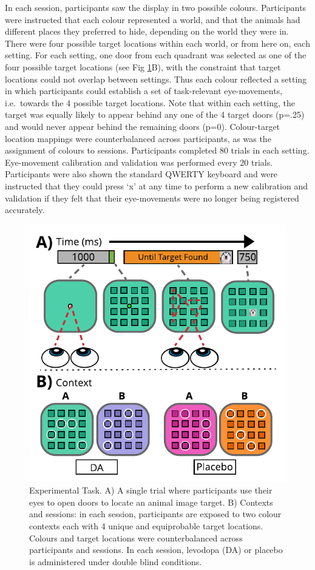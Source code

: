 \documentclass[
  man]{apa6}
\begin{document}
In each session, participants saw the display in two possible colours. Participants were instructed that each colour represented a world, and that the animals had different places they preferred to hide, depending on the world they were in. There were four possible target locations within each world, or from here on, each setting. For each setting, one door from each quadrant was selected as one of the four possible target locations (see Fig \ref{fig:taskfig}B), with the constraint that target locations could not overlap between settings. Thus each colour reflected a setting in which participants could establish a set of task-relevant eye-movements, i.e.~towards the 4 possible target locations. Note that within each setting, the target was equally likely to appear behind any one of the 4 target doors (p=.25) and would never appear behind the remaining doors (p=0). Colour-target location mappings were counterbalanced across participants, as was the assignment of colours to sessions. Participants completed 80 trials in each setting. Eye-movement calibration and validation was performed every 20 trials. Participants were also shown the standard QWERTY keyboard and were instructed that they could press `x' at any time to perform a new calibration and validation if they felt that their eye-movements were no longer being registered accurately.

\begin{figure}

{\centering \includegraphics[width=0.7\linewidth]{../../images/DA_ExpTask_RR1} 

}

\caption{Experimental Task. A) A single trial where participants use their eyes to open doors to locate an animal image target. B) Contexts and sessions: in each session, participants are exposed to two colour contexts each with 4 unique and equiprobable target locations. Colours and target locations were counterbalanced across participants and sessions. In each session, levodopa (DA) or placebo is administered under double blind conditions.}\label{fig:taskfig}
\end{figure}
\end{document}
